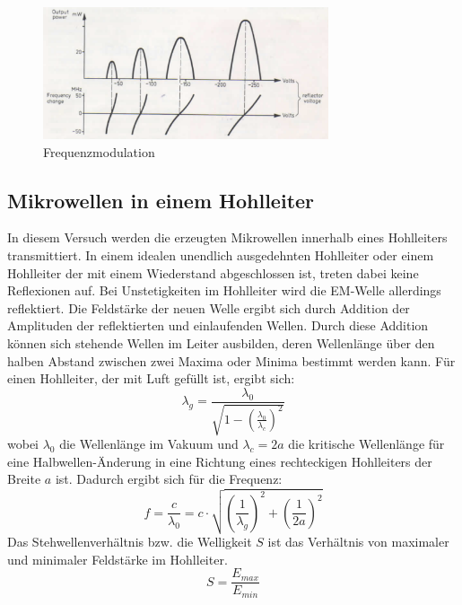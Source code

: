         \begin{figure}
            \centering
            \includegraphics[width = 0.75\textwidth]{bilder/Frequenzmodulation.png}
            \caption{Frequenzmodulation}
            \label{fig:frequenzmodulation}
        \end{figure}
    \subsection{Mikrowellen in einem Hohlleiter}
    \label{sec:Hohlleiter}
        In diesem Versuch werden die erzeugten Mikrowellen innerhalb eines Hohlleiters transmittiert.
        In einem idealen unendlich ausgedehnten Hohlleiter oder einem Hohlleiter der mit einem Wiederstand abgeschlossen ist, treten dabei keine Reflexionen auf.
        Bei Unstetigkeiten im Hohlleiter wird die EM-Welle allerdings reflektiert. 
        Die Feldstärke der neuen Welle ergibt sich durch Addition der Amplituden der reflektierten und einlaufenden Wellen.
        Durch diese Addition können sich stehende Wellen im Leiter ausbilden, deren Wellenlänge über den halben Abstand zwischen zwei Maxima oder Minima bestimmt werden kann.
        Für einen Hohlleiter, der mit Luft gefüllt ist, ergibt sich:
        \begin{equation}
            \lambda_g = \frac{\lambda_0}{\sqrt{1-\left(\frac{\lambda_0}{\lambda_c}\right)^2}}
        \end{equation}
        wobei $\lambda_0$ die Wellenlänge im Vakuum und $\lambda_c = 2a$ die kritische Wellenlänge für eine Halbwellen-Änderung in eine Richtung eines rechteckigen Hohlleiters der Breite $a$ ist.
        Dadurch ergibt sich für die Frequenz:
        \begin{equation}
            \label{eqn:frequenz}
            f = \frac{c}{\lambda_0} = c \cdot \sqrt{\left(\frac{1}{\lambda_g}\right)^2 + \left(\frac{1}{2a}\right)^2}
        \end{equation}
        Das Stehwellenverhältnis bzw. die Welligkeit $S$ ist das Verhältnis von maximaler und minimaler Feldstärke im Hohlleiter.
        \begin{equation}
            S = \frac{E_{max}}{E_{min}}
        \end{equation}
